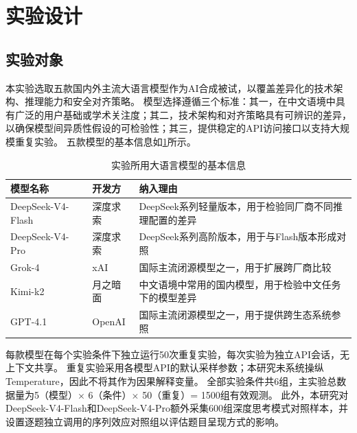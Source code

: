 \section{实验设计}

\subsection{实验对象}

本实验选取五款国内外主流大语言模型作为AI合成被试，以覆盖差异化的技术架构、推理能力和安全对齐策略。
模型选择遵循三个标准：其一，在中文语境中具有广泛的用户基础或学术关注度；其二，技术架构和对齐策略具有可辨识的差异，以确保模型间异质性假设的可检验性；其三，提供稳定的API访问接口以支持大规模重复实验。
五款模型的基本信息如\cref{tab:models}所示。

\begin{table}[tb]
  \caption{实验所用大语言模型的基本信息}
  \label{tab:models}
  \centering
  \footnotesize
  \setlength{\tabcolsep}{4pt}
  \begin{tabular}{p{0.68in}p{0.52in}p{1.8in}}
    \toprule
    模型名称 & 开发方 & 纳入理由 \\
    \midrule
    DeepSeek-V4-Flash & 深度求索 & DeepSeek系列轻量版本，用于检验同厂商不同推理配置的差异 \\
    DeepSeek-V4-Pro & 深度求索 & DeepSeek系列高阶版本，用于与Flash版本形成对照 \\
    Grok-4 & xAI & 国际主流闭源模型之一，用于扩展跨厂商比较 \\
    Kimi-k2 & 月之暗面 & 中文语境中常用的国内模型，用于检验中文任务下的模型差异 \\
    GPT-4.1 & OpenAI & 国际主流闭源模型之一，用于提供跨生态系统参照 \\
    \bottomrule
  \end{tabular}
\end{table}

每款模型在每个实验条件下独立运行50次重复实验，每次实验为独立API会话，无上下文共享。
重复实验采用各模型API的默认采样参数；本研究未系统操纵Temperature，因此不将其作为因果解释变量。
全部实验条件共6组，主实验总数据量为5（模型）$\times$ 6（条件）$\times$ 50（重复）= 1500组有效观测。
此外，本研究对DeepSeek-V4-Flash和DeepSeek-V4-Pro额外采集600组深度思考模式对照样本，并设置逐题独立调用的序列效应对照组以评估题目呈现方式的影响。

